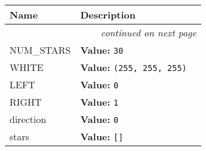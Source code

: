     \vspace{-1cm}
\hspace{\varindent}\begin{longtable}{|p{\varnamewidth}|p{\vardescrwidth}|l}
\cline{1-2}
\cline{1-2} \centering \textbf{Name} & \centering \textbf{Description}& \\
\cline{1-2}
\endhead\cline{1-2}\multicolumn{3}{r}{\small\textit{continued on next page}}\\\endfoot\cline{1-2}
\endlastfoot\raggedright N\-U\-M\-\_\-S\-T\-A\-R\-S\- & \raggedright \textbf{Value:} 
{\tt 30}&\\
\cline{1-2}
\raggedright W\-H\-I\-T\-E\- & \raggedright \textbf{Value:} 
{\tt \texttt{(}255\texttt{, }255\texttt{, }255\texttt{)}}&\\
\cline{1-2}
\raggedright L\-E\-F\-T\- & \raggedright \textbf{Value:} 
{\tt 0}&\\
\cline{1-2}
\raggedright R\-I\-G\-H\-T\- & \raggedright \textbf{Value:} 
{\tt 1}&\\
\cline{1-2}
\raggedright d\-i\-r\-e\-c\-t\-i\-o\-n\- & \raggedright \textbf{Value:} 
{\tt 0}&\\
\cline{1-2}
\raggedright s\-t\-a\-r\-s\- & \raggedright \textbf{Value:} 
{\tt \texttt{[}\texttt{]}}&\\
\cline{1-2}
\end{longtable}

